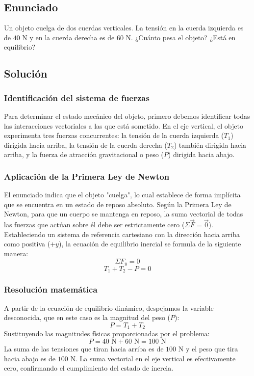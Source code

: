 \documentclass[12pt, a4paper]{article}
\begin{document}
\newpage

\subsection*{Enunciado}
Un objeto cuelga de dos cuerdas verticales. La tensión en la cuerda izquierda es de $40 \text{ N}$ y en la cuerda derecha es de $60 \text{ N}$. ¿Cuánto pesa el objeto? ¿Está en equilibrio?

\subsection*{Solución}

\subsubsection*{Identificación del sistema de fuerzas}
Para determinar el estado mecánico del objeto, primero debemos identificar todas las interacciones vectoriales a las que está sometido. En el eje vertical, el objeto experimenta tres fuerzas concurrentes: la tensión de la cuerda izquierda ($T_1$) dirigida hacia arriba, la tensión de la cuerda derecha ($T_2$) también dirigida hacia arriba, y la fuerza de atracción gravitacional o peso ($P$) dirigida hacia abajo.

\subsubsection*{Aplicación de la Primera Ley de Newton}
El enunciado indica que el objeto "cuelga", lo cual establece de forma implícita que se encuentra en un estado de reposo absoluto. Según la Primera Ley de Newton, para que un cuerpo se mantenga en reposo, la suma vectorial de todas las fuerzas que actúan sobre él debe ser estrictamente cero ($\Sigma\vec{F} = \vec{0}$). Estableciendo un sistema de referencia cartesiano con la dirección hacia arriba como positiva ($+y$), la ecuación de equilibrio inercial se formula de la siguiente manera:
$$\Sigma F_y = 0$$
$$T_1 + T_2 - P = 0$$

\subsubsection*{Resolución matemática}
A partir de la ecuación de equilibrio dinámico, despejamos la variable desconocida, que en este caso es la magnitud del peso ($P$):
$$P = T_1 + T_2$$
Sustituyendo las magnitudes físicas proporcionadas por el problema:
$$P = 40 \text{ N} + 60 \text{ N} = 100 \text{ N}$$
La suma de las tensiones que tiran hacia arriba es de $100 \text{ N}$ y el peso que tira hacia abajo es de $100 \text{ N}$. La suma vectorial en el eje vertical es efectivamente cero, confirmando el cumplimiento del estado de inercia.
\end{document}

